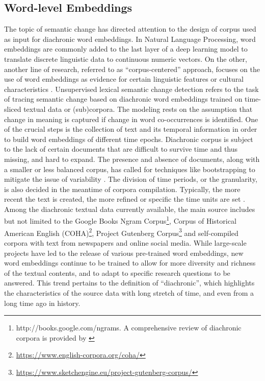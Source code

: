 \subsection{Word-level Embeddings}
The topic of semantic change has directed attention to the design of corpus used as input for diachronic word embeddings. In Natural Language Processing, word embeddings are commonly added to the last layer of a deep learning model to translate discrete linguistic data to continuous numeric vectors. On the other, another line of research, referred to as ``corpus-centered'' approach, focuses on the use of word embeddings as evidence for certain linguistic features or cultural characteristics \parencite{antoniak2018evaluating}. Unsupervised lexical semantic change detection refers to the task of tracing semantic change based on diachronic word embeddings trained on time-sliced textual data or (sub)corpora. The modeling rests on the assumption that change in meaning is captured if change in word co-occurrences is identified. One of the crucial steps is the collection of text and its temporal information in order to build word embeddings of different time epochs. Diachronic corpus is subject to the lack of certain documents that are difficult to survive time and thus missing, and hard to expand. The presence and absence of documents, along with a smaller or less balanced corpus, has called for techniques like bootstrapping to mitigate the issue of variability \parencite{antoniak2018evaluating}.  The division of time periods, or the granularity, is also decided in the meantime of corpora compilation. Typically, the more recent the text is created, the more refined or specific the time units are set \parencite{kutuzov2018survey}. Among the diachronic textual data currently available, the main source includes but not limited to the Google Books Ngram Corpus\footnote{http://books.google.com/ngrams. A comprehensive review of diachronic corpora is provided by \textcite[38--41]{tahmasebi2018survey}}, Corpus of Historical American English (COHA)\footnote{\url{https://www.english-corpora.org/coha/}}, Project Gutenberg Corpus\footnote{\url{https://www.sketchengine.eu/project-gutenberg-corpus/}} and self-compiled corpora with text from newspapers and online social media. While large-scale projects have led to the release of various pre-trained word embeddings, new word embeddings continue to be trained to allow for more diversity and richness of the textual contents, and to adapt to specific research questions to be answered. This trend pertains to the definition of ``diachronic'', which highlights the characteristics of the source data with long stretch of time, and even from a long time ago in history.

